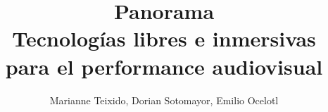 \documentclass[12pt,letterpaper, twocolumn]{article}
\author{Marianne Teixido, Dorian Sotomayor, Emilio Ocelotl}
\title{%
  Panorama \\
  \large Tecnologías libres e inmersivas para el performance audiovisual}
\begin{document}
\maketitle

\begin{abstract}
  
\end{abstract}




  

\theendnotes %

\nocite{interactiveDigitalMusic}
\nocite{speakingCode}

%
{}

\end{document}

